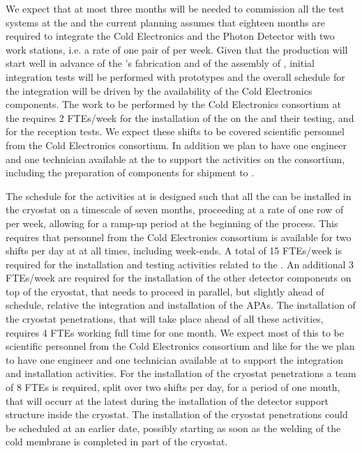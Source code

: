 We expect that at most three months will be needed to commission
all the test systems at the  and the current planning
assumes that eighteen months are required to integrate the Cold
Electronics and the Photon Detector with two work stations, i.e.
a rate of one pair of  per week. Given that the 
production will start well in advance of the 's fabrication
and of the assembly of , initial integration tests will 
be performed with  prototypes and the overall schedule
for the integration will be driven by the availability of the Cold
Electronics components. The work to be performed by the Cold Electronics
consortium at the  requires 2 FTEs/week for the installation 
of the  on the  and their testing, and for 
the  reception tests. We expect these shifts to be covered 
scientific personnel  from the Cold Electronics consortium. In addition 
we plan to have one engineer and one technician available at the 
 to support the activities on the consortium, including 
the preparation of components for shipment to \surf.

The schedule for the activities at \surf is designed such that all the
 can be installed in the cryostat on a timescale of seven
months, proceeding at a rate of one row of  per week, allowing
for a ramp-up period at the beginning of the process. This
requires that personnel from the Cold Electronics consortium is available
for two shifts per day at \surf at all times, including week-ends. A
total of 15 FTEs/week is required for the installation and testing 
activities related to the . An additional 3 FTEs/week are
required for the installation of the other detector components on
top of the cryostat, that needs to proceed in parallel, but slightly
ahead of schedule, relative the integration and installation of the
APAs. The installation of the cryostat penetrations, that will take
place ahead of all these activities, requires 4 FTEs working full time
for one month. We expect most of this to be scientific personnel from
the Cold Electronics consortium and like for the  we plan
to have one engineer and one technician available at \surf to support
the integration and installation activities. For the installation of
the cryostat penetrations a team of 8 FTEs is required, split over
two shifts per day, for a period of one month, that will occurr at
the latest during the installation of the detector support structure
inside the cryostat. The installation of the cryostat penetrations
could be scheduled at an earlier date, possibly starting as soon 
as the welding of the cold membrane is completed in part of the cryostat.

